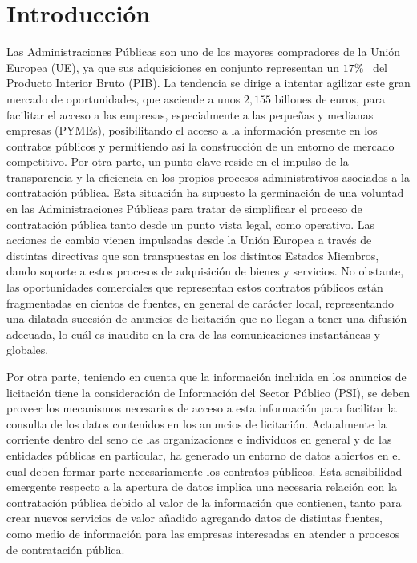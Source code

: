 \documentclass[a4paper,twoside,12pt]{report}
\begin{document}
\chapter{\label{capitulo:introduccion}Introducción} %
Las Administraciones Públicas son uno de los mayores compradores de la Unión \gls{Europea} (UE), ya que
sus adquisiciones en conjunto representan un $17$\%~\cite{europeanStrategy} del Producto Interior Bruto (\gls{PIB}). La tendencia se dirige a intentar 
agilizar este gran mercado de oportunidades, que asciende a unos $2,155$ billones de euros, para 
facilitar el acceso a las empresas, especialmente a las pequeñas y medianas empresas (\gls{PYME}s), posibilitando 
el acceso a la información presente en los contratos públicos y permitiendo así la construcción de un entorno de mercado competitivo. Por otra parte, 
un punto clave reside en el impulso de la transparencia y la eficiencia en los propios procesos administrativos asociados a la contratación pública.
Esta situación ha supuesto la germinación de una voluntad en las Administraciones Públicas para tratar de simplificar 
el proceso de contratación pública tanto desde un punto vista legal, como operativo. Las acciones de cambio vienen impulsadas desde la Unión Europea 
a través de distintas directivas que son transpuestas en los distintos \gls{Estados} Miembros, dando soporte a estos procesos de adquisición de bienes y servicios. 
No obstante, las oportunidades comerciales que representan estos contratos públicos están fragmentadas en 
cientos de fuentes, en general de carácter local, representando una dilatada sucesión de anuncios de 
licitación que no llegan a tener una difusión adecuada, lo cuál es inaudito en la era de las comunicaciones instantáneas 
y globales. 

Por otra parte, teniendo en cuenta que la información incluida en los anuncios de licitación
tiene la consideración de Información del Sector Público (\gls{PSI}), se deben proveer los mecanismos
necesarios de acceso a esta información para facilitar la consulta de los datos contenidos
en los anuncios de licitación. Actualmente la corriente \opendata dentro del seno de las organizaciones e individuos en general y de las entidades públicas en particular, ha generado un entorno
de datos abiertos en el cual deben formar parte necesariamente los contratos públicos. 
Esta sensibilidad emergente respecto a la apertura de datos implica una necesaria relación con la 
contratación pública debido al valor de la información que contienen, tanto para crear nuevos servicios 
de valor añadido agregando datos de distintas fuentes, como medio de información para 
las empresas interesadas en atender a procesos de contratación pública.
\end{document}
